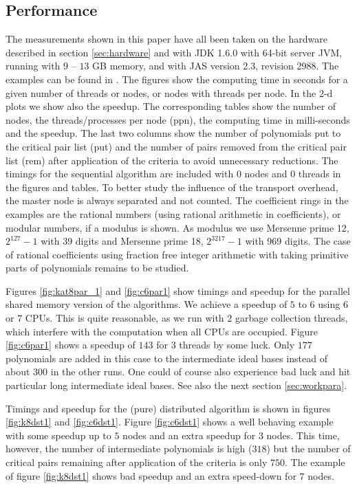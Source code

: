 \documentclass[10pt,twocolumn,a4paper]{article}
\begin{document}
\subsection{Performance} \label{:sec:perf}

The measurements shown in this paper have all been taken on the
hardware described in section \ref{sec:hardware} and with JDK 1.6.0
with 64-bit server JVM, running with $9$ -- $13$ GB memory, and with
JAS version 2.3, revision 2988.  The examples can be found in
\cite{Graebe:2006}.  The figures show the computing time in seconds
for a given number of threads or nodes, or nodes with threads per node.
In the 2-d plots we show also the speedup.  The corresponding tables
show the number of nodes, the threads/processes per node (ppn), the
computing time in milli-seconds and the speedup. The last two columns
show the number of polynomials put to the critical pair list (put) and
the number of pairs removed from the critical pair list (rem) after
application of the criteria to avoid unnecessary reductions.  The
timings for the sequential algorithm are included with $0$ nodes and
$0$ threads in the figures and tables. To better study the influence
of the transport overhead, the master node is always separated and not
counted.
The coefficient rings in the examples are the rational numbers (using
rational arithmetic in coefficients), or modular numbers, if a modulus
is shown.  As modulus we use Mersenne prime 12, $2^{127}-1$ with 39
digits and Mersenne prime 18, $2^{3217}-1$ with 969 digits.  The case
of rational coefficients using fraction free integer arithmetic with
taking primitive parts of polynomials remains to be studied.

Figures \ref{fig:kat8par_1} and \ref{fig:c6par1} show timings and
speedup for the parallel shared memory version of the algorithms.  We
achieve a speedup of $5$ to $6$ using $6$ or $7$ CPUs. This is quite
reasonable, as we run with $2$ garbage collection threads, which
interfere with the computation when all CPUs are occupied.  Figure
\ref{fig:c6par1} shows a speedup of $143$ for $3$ threads by some luck.
Only $177$ polynomials are added in this case to the intermediate ideal
bases instead of about $300$ in the other runs. One could of course also
experience bad luck and hit particular long intermediate ideal bases.
See also the next section \ref{sec:workpara}.


Timings and speedup for the (pure) distributed algorithm is shown in
figures \ref{fig:k8dst1} and \ref{fig:c6dst1}. Figure \ref{fig:c6dst1} shows a well behaving example with some
speedup up to $5$ nodes and an extra speedup for $3$ nodes. This time,
however, the number of intermediate polynomials is high ($318$) but the
number of critical pairs remaining after application of the criteria
is only $750$. The example of figure \ref{fig:k8dst1} shows bad speedup
and an extra speed-down for $7$ nodes.
\end{document}
